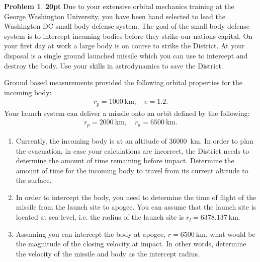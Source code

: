 \documentclass[10pt]{article}
\theoremstyle{definition}
\newtheorem{prob}{Problem}[section]
\newenvironment{subprob}%
{\renewcommand{\theenumi}{\alph{enumi}}\renewcommand{\labelenumi}{(\theenumi)}\begin{enumerate}}%
{\end{enumerate}}%
\begin{document}
\begin{prob}
    \textbf{20pt}
    Due to your extensive orbital mechanics training at the George Washington University, you have been hand selected to lead the Washington DC small body defense system. 
    The goal of the small body defense system is to intercept incoming bodies before they strike our nations capital. 
    On your first day at work a large body is on course to strike the District. 
    At your disposal is a single ground launched missile which you can use to intercept and destroy the body. 
    Use your skills in astrodynamics to save the District. 

    Ground based measurements provided the following orbital properties for the incoming body:
    \begin{align}
        r_p = \SI{1000}{\kilo\meter}, \quad e = 1.2.
    \end{align}
    Your launch system can deliver a missile onto an orbit defined by the following:
    \begin{align}
        r_p = \SI{2000}{\kilo\meter}, \quad r_a = \SI{6500}{\kilo\meter} .
    \end{align}

\begin{subprob}
    \item Currently, the incoming body is at an altitude of \SI{36000}{\kilo\meter}.
        In order to plan the evacuation, in case your calculations are incorrect, the District needs to determine the amount of time remaining before impact.
        Determine the amount of time for the incoming body to travel from its current altitude to the surface.
    \item In order to intercept the body, you need to determine the time of flight of the missile from the launch site to apogee. 
        You can assume that the launch site is located at sea level, i.e. the radius of the launch site is \( r_l = \SI{6378.137}{\kilo\meter}\).
    \item Assuming you can intercept the body at apogee, \( r = \SI{6500}{\kilo\meter} \), what would be the magnitude of the closing velocity at impact.
        In other words, determine the velocity of the missile and body as the intercept radius.
\end{subprob}
\end{prob}
\end{document}
